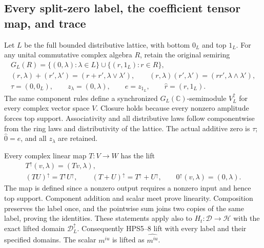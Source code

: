 \subsection{Every split-zero label, the coefficient tensor map, and trace}

Let $L$ be the full bounded distributive lattice,
with bottom $0_L$ and top $1_L$.
For any unital commutative complex algebra $R$,
retain the original semiring
\begin{equation}\tag{HPS22}
\begin{gathered}
 G_L(R)=\{(0,\lambda):\lambda\in L\}
                  \cup\{(r,1_L):r\in R\},\\
 (r,\lambda)+(r',\lambda')
             =(r+r',\lambda\vee\lambda'),\qquad
 (r,\lambda)(r',\lambda')
             =(rr',\lambda\wedge\lambda'),\\
 \tau=(0,0_L),\qquad z_\lambda=(0,\lambda),
 \qquad e=z_{1_L},\qquad \widehat r=(r,1_L).
\end{gathered}
\end{equation}
The same component rules define a synchronized
$G_L(\mathbb C)$-semimodule $V_L^\uparrow$ for
every complex vector space $V$.
Closure holds because every nonzero amplitude
forces top support. Associativity and all
distributive laws follow componentwise from
the ring laws and distributivity of the
lattice. The actual additive zero is $\tau$;
$\widehat0=e$, and all $z_\lambda$ are retained.

Every complex linear map $T:V\to W$ has the lift
\begin{equation}\tag{HPS23}
\begin{gathered}
 T^\uparrow(v,\lambda)=(Tv,\lambda),\\
 (TU)^\uparrow=T^\uparrow U^\uparrow,\qquad
 (T+U)^\uparrow=T^\uparrow+U^\uparrow,\qquad
 0^\uparrow(v,\lambda)=(0,\lambda).
\end{gathered}
\end{equation}
The map is defined since a nonzero output
requires a nonzero input and hence top
support. Component addition and scalar meet
prove linearity. Composition preserves the
label once, and the pointwise sum joins two
copies of the same label, proving the
identities. These statements apply also to
$H_t:\mathcal D\to\mathcal H$ with the
exact lifted domain $\mathcal D_L^\uparrow$.
Consequently HPS5--8 lift with every label
and their specified domains. The scalar
$m^{iu}$ is lifted as $\widehat{m^{iu}}$.

